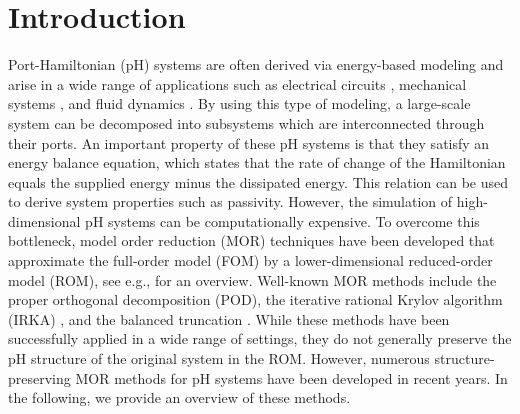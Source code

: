 \documentclass{article}
\newcommand{\pH}{\textsf{pH}\xspace}
\newcommand{\IRKA}{\textsf{IRKA}\xspace}
\newcommand{\POD}{\textsf{POD}\xspace}
\newcommand{\FOM}{\textsf{FOM}\xspace}
\newcommand{\ROM}{\textsf{ROM}\xspace}
\newcommand{\MOR}{\textsf{MOR}\xspace}
\begin{document}
\section{Introduction}
		Port-Hamiltonian (\pH) systems are often derived via energy-based modeling and arise in a wide range of applications such as electrical circuits \cite{falaize2016passive}, mechanical systems \cite{duindam2009modeling}, and fluid dynamics \cite{califano2021geometric}. By using this type of modeling, a large-scale system can be decomposed into subsystems which are interconnected through their ports. 
		An important property of these \pH systems is that they satisfy an energy balance equation, which states that
		the rate of change of the Hamiltonian equals the supplied energy minus the dissipated energy. This relation can be used to derive system properties such as passivity. 
		However, the simulation of high-dimensional \pH systems can be computationally expensive. 
		To overcome this bottleneck, model order reduction (\MOR) techniques have been developed that approximate the full-order model (\FOM) by a lower-dimensional reduced-order model (\ROM), see e.g., \cite{Antoulas2005, BennerGugercinWilcox2015, BennerOhlbergerCW2017, Hesthaven_Peherstorfer_Unger_2026} for an overview. Well-known \MOR methods include the proper orthogonal decomposition (\POD)\cite{sirovich1987turbulence}, the iterative rational Krylov algorithm (\IRKA) \cite{antoulas2010interpolatory}, and the balanced truncation \cite{moore1981principal}. While these methods have been successfully applied in a wide range of settings, they do not generally preserve the \pH structure of the original system in the \ROM.
		However, numerous structure-preserving \MOR methods for \pH systems have been developed in recent years. In the following, we provide an overview of these methods.
		
\end{document}
